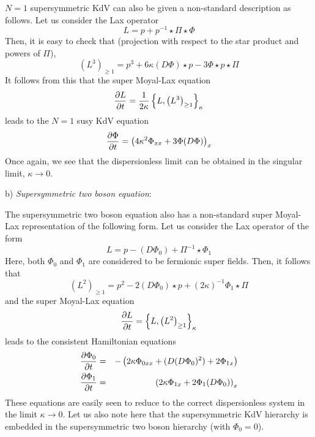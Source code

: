 \documentclass[a4paper,11pt]{article}
\begin{document}
$N=1$ supersymmetric KdV can also be given a non-standard description
as follows. Let us consider the Lax operator
\begin{equation}
L = p + p^{-1}\star \Pi\star \Phi
\end{equation}
Then, it is easy to check that (projection with respect to the star
product and powers of $\Pi$),
\begin{equation}
\left(L^{3}\right)_{\geq 1} = p^{3} + 6\kappa (D\Phi)\star p -
3\Phi\star p\star \Pi
\end{equation}
It follows from this that the super Moyal-Lax equation
\begin{equation}
{\partial L\over \partial t} = {1\over 2\kappa} \left\{L,
\left(L^{3}\right)_{\geq 1}\right\}_{\kappa}
\end{equation}
leads to the $N=1$ susy KdV equation
\begin{equation}
{\partial \Phi\over \partial t} = \left(4\kappa^{2} \Phi_{xx} + 3 \Phi
(D\Phi)\right)_{x}
\end{equation}
Once again, we see that the dispersionless limit can be obtained in
the singular limit, $\kappa\rightarrow 0$.

b) {\it Supersymmetric two boson equation}:
\medskip

The supersymmetric two boson equation \cite{5} also has a non-standard super
Moyal-Lax representation of the following form. Let us consider the
Lax operator of the form
\begin{equation}
L = p - (D\Phi_{0}) + \Pi^{-1}\star \Phi_{1}
\end{equation}
Here, both $\Phi_{0}$ and $\Phi_{1}$ are considered to be fermionic
super fields. Then, it follows that
\begin{equation}
\left(L^{2}\right)_{\geq 1} = p^{2} - 2 (D\Phi_{0})\star p +
(2\kappa)^{-1} \Phi_{1}\star \Pi
\end{equation}
and the super Moyal-Lax equation
\begin{equation}
{\partial L\over \partial t} = \left\{L, \left(L^{2}\right)_{\geq
1}\right\}_{\kappa}
\end{equation}
leads to the consistent Hamiltonian equations
\begin{eqnarray}
{\partial \Phi_{0}\over \partial t} & = & -\left(2\kappa \Phi_{0xx} +
(D(D\Phi_{0})^{2}) + 2\Phi_{1x}\right)\nonumber\\
{\partial \Phi_{1}\over \partial t} & = & \left(2\kappa \Phi_{1x} + 2
\Phi_{1} (D\Phi_{0})\right)_{x}
\end{eqnarray}
These equations are easily seen to reduce to the correct
dispersionless system \cite{17} in the limit $\kappa\rightarrow
0$. Let us  also
note here that the supersymmetric KdV hierarchy is embedded in the
supersymmetric two boson hierarchy (with $\Phi_{0}=0$).
\end{document}
